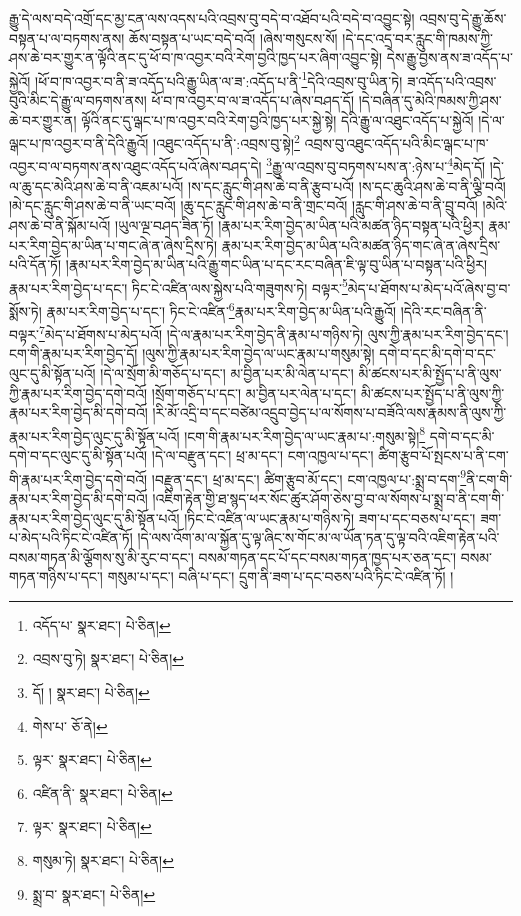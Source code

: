 རྒྱུ་དེ་ལས་བདེ་འགྲོ་དང་མྱ་ངན་ལས་འདས་པའི་འབྲས་བུ་བདེ་བ་འཐོབ་པའི་བདེ་བ་འབྱུང་སྟེ། འབྲས་བུ་དེ་རྒྱུ་ཆོས་བསྟན་པ་ལ་བཏགས་ནས། ཆོས་བསྟན་པ་ཡང་བདེ་བའོ། །ཞེས་གསུངས་སོ། །དེ་དང་འདྲ་བར་རླུང་གི་ཁམས་ཀྱི་ཤས་ཆེ་བར་གྱུར་ན་ལྟོའི་ནང་དུ་ཕོ་བ་ཁ་འབྱར་བའི་རེག་བྱའི་ཁྱད་པར་ཞིག་འབྱུང་སྟེ། དེས་རྒྱུ་བྱས་ནས་ཟ་འདོད་པ་སྐྱེའོ། །ཕོ་བ་ཁ་འབྱར་བ་ནི་ཟ་འདོད་པའི་རྒྱུ་ཡིན་ལ་ཟ་:འདོད་པ་ནི་\footnote{འདོད་པ་  སྣར་ཐང་།  པེ་ཅིན། }དེའི་འབྲས་བུ་ཡིན་ཏེ། ཟ་འདོད་པའི་འབྲས་བུའི་མིང་དེ་རྒྱུ་ལ་བཏགས་ནས། ཕོ་བ་ཁ་འབྱར་བ་ལ་ཟ་འདོད་པ་ཞེས་བཤད་དོ། །དེ་བཞིན་དུ་མེའི་ཁམས་ཀྱི་ཤས་ཆེ་བར་གྱུར་ན། ལྟོའི་ནང་དུ་ལྒང་པ་ཁ་འབྱར་བའི་རེག་བྱའི་ཁྱད་པར་སྐྱེ་སྟེ། དེའི་རྒྱུ་ལ་འཐུང་འདོད་པ་སྐྱེའོ། །དེ་ལ་ལྒང་པ་ཁ་འབྱར་བ་ནི་དེའི་རྒྱུའོ། །འཐུང་འདོད་པ་ནི་:འབྲས་བུ་སྟེ།\footnote{འབྲས་བུ་ཏེ།  སྣར་ཐང་།  པེ་ཅིན། } འབྲས་བུ་འཐུང་འདོད་པའི་མིང་ལྒང་པ་ཁ་འབྱར་བ་ལ་བཏགས་ནས་འཐུང་འདོད་པའོ་ཞེས་བཤད་དེ། \footnote{དོ། །   སྣར་ཐང་།  པེ་ཅིན། }རྒྱུ་ལ་འབྲས་བུ་བཏགས་པས་ན་:ཉེས་པ་\footnote{གེས་པ་  ཅོ་ནེ། }མེད་དོ། །དེ་ལ་ཆུ་དང་མེའི་ཤས་ཆེ་བ་ནི་འཇམ་པའོ། །ས་དང་རླུང་གི་ཤས་ཆེ་བ་ནི་རྩུབ་པའོ། །ས་དང་ཆུའི་ཤས་ཆེ་བ་ནི་ལྕི་བའོ། །མེ་དང་རླུང་གི་ཤས་ཆེ་བ་ནི་ཡང་བའོ། །ཆུ་དང་རླུང་གི་ཤས་ཆེ་བ་ནི་གྲང་བའོ། །རླུང་གི་ཤས་ཆེ་བ་ནི་བྲུ་བའོ། །མེའི་ཤས་ཆེ་བ་ནི་སྐོམ་པའོ། །ཡུལ་ལྔ་བཤད་ཟིན་ཏོ། །རྣམ་པར་རིག་བྱེད་མ་ཡིན་པའི་མཚན་ཉིད་བསྟན་པའི་ཕྱིར། རྣམ་པར་རིག་བྱེད་མ་ཡིན་པ་གང་ཞེ་ན་ཞེས་དྲིས་ཏེ། རྣམ་པར་རིག་བྱེད་མ་ཡིན་པའི་མཚན་ཉིད་གང་ཞེ་ན་ཞེས་དྲིས་པའི་དོན་ཏོ། །རྣམ་པར་རིག་བྱེད་མ་ཡིན་པའི་རྒྱུ་གང་ཡིན་པ་དང་རང་བཞིན་ཇི་ལྟ་བུ་ཡིན་པ་བསྟན་པའི་ཕྱིར། རྣམ་པར་རིག་བྱེད་པ་དང་། ཏིང་ངེ་འཛིན་ལས་སྐྱེས་པའི་གཟུགས་ཏེ། བལྟར་\footnote{ལྟར་  སྣར་ཐང་།  པེ་ཅིན། }མེད་པ་ཐོགས་པ་མེད་པའོ་ཞེས་བྱ་བ་སྨོས་ཏེ། རྣམ་པར་རིག་བྱེད་པ་དང་། ཏིང་ངེ་འཛིན་\footnote{འཛིན་ནི་  སྣར་ཐང་།  པེ་ཅིན། }རྣམ་པར་རིག་བྱེད་མ་ཡིན་པའི་རྒྱུའོ། །དེའི་རང་བཞིན་ནི་བལྟར་\footnote{ལྟར་  སྣར་ཐང་།  པེ་ཅིན། }མེད་པ་ཐོགས་པ་མེད་པའོ། །དེ་ལ་རྣམ་པར་རིག་བྱེད་ནི་རྣམ་པ་གཉིས་ཏེ། ལུས་ཀྱི་རྣམ་པར་རིག་བྱེད་དང་། ངག་གི་རྣམ་པར་རིག་བྱེད་དོ། །ལུས་ཀྱི་རྣམ་པར་རིག་བྱེད་ལ་ཡང་རྣམ་པ་གསུམ་སྟེ། དགེ་བ་དང་མི་དགེ་བ་དང་ལུང་དུ་མི་སྟོན་པའོ། །དེ་ལ་སྲོག་མི་གཅོད་པ་དང་། མ་བྱིན་པར་མི་ལེན་པ་དང་། མི་ཚངས་པར་མི་སྤྱོད་པ་ནི་ལུས་ཀྱི་རྣམ་པར་རིག་བྱེད་དགེ་བའོ། །སྲོག་གཅོད་པ་དང་། མ་བྱིན་པར་ལེན་པ་དང་། མི་ཚངས་པར་སྤྱོད་པ་ནི་ལུས་ཀྱི་རྣམ་པར་རིག་བྱེད་མི་དགེ་བའོ། །རི་མོ་འདྲི་བ་དང་བཙེམ་འདྲུབ་བྱེད་པ་ལ་སོགས་པ་བཟོའི་ལས་རྣམས་ནི་ལུས་ཀྱི་རྣམ་པར་རིག་བྱེད་ལུང་དུ་མི་སྟོན་པའོ། །ངག་གི་རྣམ་པར་རིག་བྱེད་ལ་ཡང་རྣམ་པ་:གསུམ་སྟེ།\footnote{གསུམ་ཏེ།  སྣར་ཐང་།  པེ་ཅིན། } དགེ་བ་དང་མི་དགེ་བ་དང་ལུང་དུ་མི་སྟོན་པའོ། །དེ་ལ་བརྫུན་དང་། ཕྲ་མ་དང་། ངག་འཁྱལ་པ་དང་། ཚིག་རྩུབ་པོ་སྤངས་པ་ནི་ངག་གི་རྣམ་པར་རིག་བྱེད་དགེ་བའོ། །བརྫུན་དང་། ཕྲ་མ་དང་། ཚིག་རྩུབ་མོ་དང་། ངག་འཁྱལ་པ་:སྨྲ་བ་དག་\footnote{སྨྲ་བ་  སྣར་ཐང་།  པེ་ཅིན། }ནི་ངག་གི་རྣམ་པར་རིག་བྱེད་མི་དགེ་བའོ། །འཇིག་རྟེན་གྱི་ཐ་སྙད་ཕར་སོང་ཚུར་ཤོག་ཅེས་བྱ་བ་ལ་སོགས་པ་སྨྲ་བ་ནི་ངག་གི་རྣམ་པར་རིག་བྱེད་ལུང་དུ་མི་སྟོན་པའོ། །ཏིང་ངེ་འཛིན་ལ་ཡང་རྣམ་པ་གཉིས་ཏེ། ཟག་པ་དང་བཅས་པ་དང་། ཟག་པ་མེད་པའི་ཏིང་ངེ་འཛིན་ཏོ། །དེ་ལས་འོག་མ་ལ་སྐྱོན་དུ་ལྟ་ཞིང་ས་གོང་མ་ལ་ཡོན་ཏན་དུ་ལྟ་བའི་འཇིག་རྟེན་པའི་བསམ་གཏན་མི་ལྕོགས་སུ་མི་རུང་བ་དང་། བསམ་གཏན་དང་པོ་དང་བསམ་གཏན་ཁྱད་པར་ཅན་དང་། བསམ་གཏན་གཉིས་པ་དང་། གསུམ་པ་དང་། བཞི་པ་དང་། དྲུག་ནི་ཟག་པ་དང་བཅས་པའི་ཏིང་ངེ་འཛིན་ཏོ། །
